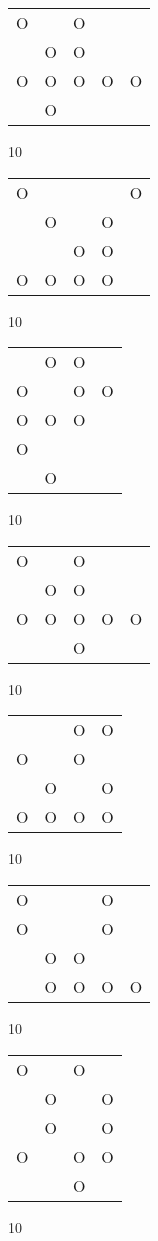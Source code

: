 \begin{tabular}{|m{0.2cm}m{0.2cm}m{0.2cm}m{0.2cm}m{0.2cm}|}\hline
O& &O& & \\
 &O&O& & \\
O&O&O&O&O\\
 &O& & & \\
\hline\end{tabular}10
\begin{tabular}{|m{0.2cm}m{0.2cm}m{0.2cm}m{0.2cm}m{0.2cm}|}\hline
O& & & &O\\
 &O& &O& \\
 & &O&O& \\
O&O&O&O& \\
\hline\end{tabular}10
\begin{tabular}{|m{0.2cm}m{0.2cm}m{0.2cm}m{0.2cm}|}\hline
 &O&O& \\
O& &O&O\\
O&O&O& \\
O& & & \\
 &O& & \\
\hline\end{tabular}10
\begin{tabular}{|m{0.2cm}m{0.2cm}m{0.2cm}m{0.2cm}m{0.2cm}|}\hline
O& &O& & \\
 &O&O& & \\
O&O&O&O&O\\
 & &O& & \\
\hline\end{tabular}10
\begin{tabular}{|m{0.2cm}m{0.2cm}m{0.2cm}m{0.2cm}|}\hline
 & &O&O\\
O& &O& \\
 &O& &O\\
O&O&O&O\\
\hline\end{tabular}10
\begin{tabular}{|m{0.2cm}m{0.2cm}m{0.2cm}m{0.2cm}m{0.2cm}|}\hline
O& & &O& \\
O& & &O& \\
 &O&O& & \\
 &O&O&O&O\\
\hline\end{tabular}10
\begin{tabular}{|m{0.2cm}m{0.2cm}m{0.2cm}m{0.2cm}|}\hline
O& &O& \\
 &O& &O\\
 &O& &O\\
O& &O&O\\
 & &O& \\
\hline\end{tabular}10
